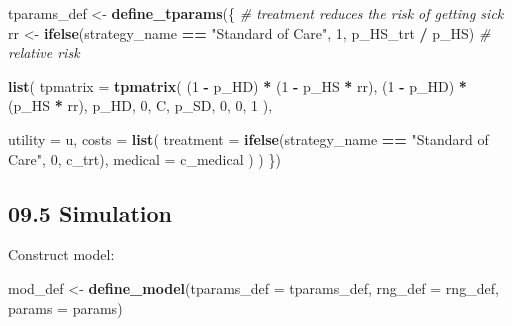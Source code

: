 \documentclass[
]{article}
\newenvironment{Shaded}{\begin{snugshade}}{\end{snugshade}}
\newcommand{\CommentTok}[1]{\textcolor[rgb]{0.56,0.35,0.01}{\textit{#1}}}
\newcommand{\DataTypeTok}[1]{\textcolor[rgb]{0.13,0.29,0.53}{#1}}
\newcommand{\DecValTok}[1]{\textcolor[rgb]{0.00,0.00,0.81}{#1}}
\newcommand{\KeywordTok}[1]{\textcolor[rgb]{0.13,0.29,0.53}{\textbf{#1}}}
\newcommand{\NormalTok}[1]{#1}
\newcommand{\OperatorTok}[1]{\textcolor[rgb]{0.81,0.36,0.00}{\textbf{#1}}}
\newcommand{\StringTok}[1]{\textcolor[rgb]{0.31,0.60,0.02}{#1}}
\begin{document}
\begin{Shaded}
\begin{Highlighting}[]
\NormalTok{tparams_def <-}\StringTok{ }\KeywordTok{define_tparams}\NormalTok{(\{}
  \CommentTok{# treatment reduces the risk of getting sick}
\NormalTok{  rr <-}\StringTok{ }\KeywordTok{ifelse}\NormalTok{(strategy_name }\OperatorTok{==}\StringTok{ "Standard of Care"}\NormalTok{, }\DecValTok{1}\NormalTok{, p_HS_trt }\OperatorTok{/}\StringTok{ }\NormalTok{p_HS) }\CommentTok{# relative risk}
  
  \KeywordTok{list}\NormalTok{(}
    \DataTypeTok{tpmatrix =} \KeywordTok{tpmatrix}\NormalTok{(}
\NormalTok{      (}\DecValTok{1} \OperatorTok{-}\StringTok{ }\NormalTok{p_HD) }\OperatorTok{*}\StringTok{ }\NormalTok{(}\DecValTok{1} \OperatorTok{-}\StringTok{ }\NormalTok{p_HS }\OperatorTok{*}\StringTok{ }\NormalTok{rr),  (}\DecValTok{1} \OperatorTok{-}\StringTok{ }\NormalTok{p_HD) }\OperatorTok{*}\StringTok{ }\NormalTok{(p_HS }\OperatorTok{*}\StringTok{ }\NormalTok{rr),  p_HD,  }
       \DecValTok{0}\NormalTok{,  C,  p_SD,}
       \DecValTok{0}\NormalTok{,  }\DecValTok{0}\NormalTok{,  }\DecValTok{1}          
\NormalTok{    ),}
    
    \DataTypeTok{utility =}\NormalTok{ u,}
    \DataTypeTok{costs =} \KeywordTok{list}\NormalTok{(}
      \DataTypeTok{treatment =} \KeywordTok{ifelse}\NormalTok{(strategy_name }\OperatorTok{==}\StringTok{ "Standard of Care"}\NormalTok{, }\DecValTok{0}\NormalTok{, c_trt),}
      \DataTypeTok{medical   =}\NormalTok{ c_medical}
\NormalTok{    )}
\NormalTok{  )}
\NormalTok{\})}
\end{Highlighting}
\end{Shaded}

\hypertarget{simulation}{%
\subsection{09.5 Simulation}\label{simulation}}

Construct model:

\begin{Shaded}
\begin{Highlighting}[]
\NormalTok{mod_def <-}\StringTok{ }\KeywordTok{define_model}\NormalTok{(}\DataTypeTok{tparams_def =}\NormalTok{ tparams_def, }
                        \DataTypeTok{rng_def     =}\NormalTok{ rng_def, }
                        \DataTypeTok{params      =}\NormalTok{ params)}
\end{Highlighting}
\end{Shaded}
\end{document}
